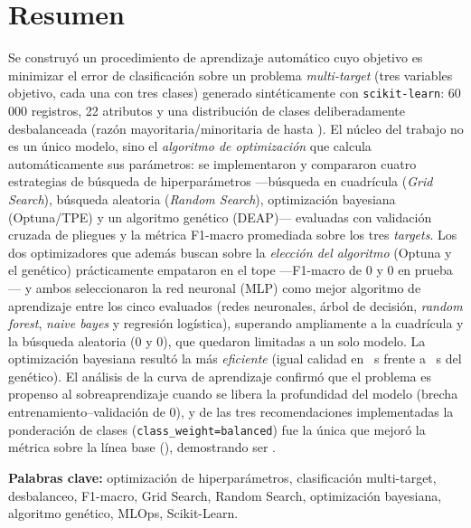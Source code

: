 \documentclass[11pt,a4paper,twocolumn]{article}
\providecommand{\Nsamples}{60\,000}\providecommand{\Nfeatures}{22}
\providecommand{\GridFtest}{0}\providecommand{\GridGap}{0}\providecommand{\GridHam}{0}\providecommand{\GridSubset}{0}
\providecommand{\RandFtest}{0}\providecommand{\RandGap}{0}\providecommand{\RandHam}{0}\providecommand{\RandSubset}{0}
\providecommand{\OptunaFtest}{0}\providecommand{\OptunaGap}{0}\providecommand{\OptunaHam}{0}\providecommand{\OptunaSubset}{0}
\providecommand{\GenFtest}{0}\providecommand{\GenGap}{0}\providecommand{\GenHam}{0}\providecommand{\GenSubset}{0}
\providecommand{\LCgap}{0}\providecommand{\LCtrainEnd}{0}\providecommand{\LCcvEnd}{0}\providecommand{\LCcvStart}{0}\providecommand{\PCAneff}{16}
\begin{document}
\section*{Resumen}
Se construyó un procedimiento de aprendizaje automático cuyo objetivo es minimizar el error de
clasificación sobre un problema \textit{multi-target} (tres variables objetivo, cada una con tres clases)
generado sintéticamente con \texttt{scikit-learn}: \Nsamples{} registros, \Nfeatures{} atributos y una
distribución de clases deliberadamente desbalanceada (razón mayoritaria/minoritaria de hasta \IRmax{}). El
núcleo del trabajo no es un único modelo, sino el \emph{algoritmo de optimización} que calcula
automáticamente sus parámetros: se implementaron y compararon cuatro estrategias de búsqueda de
hiperparámetros ---búsqueda en cuadrícula (\textit{Grid Search}), búsqueda aleatoria (\textit{Random
Search}), optimización bayesiana (Optuna/TPE) y un algoritmo genético (DEAP)--- evaluadas con validación
cruzada de \CVfolds{} pliegues y la métrica F1-macro promediada sobre los tres \textit{targets}. Los dos
optimizadores que además buscan sobre la \emph{elección del algoritmo} (Optuna y el genético) prácticamente
empataron en el tope ---F1-macro de \OptunaFtest{} y \GenFtest{} en prueba--- y ambos seleccionaron la red
neuronal (MLP) como mejor algoritmo de aprendizaje entre los cinco evaluados (redes neuronales, árbol de
decisión, \textit{random forest}, \textit{naive bayes} y regresión logística), superando ampliamente a la
cuadrícula y la búsqueda aleatoria (\GridFtest{} y \RandFtest{}), que quedaron limitadas a un solo modelo.
La optimización bayesiana resultó la más \emph{eficiente} (igual calidad en \OptunaTime{}~s frente a
\GenTime{}~s del genético). El análisis de la curva de
aprendizaje confirmó que el problema es propenso al sobreaprendizaje cuando se libera la profundidad del
modelo (brecha entrenamiento--validación de \LCgap{}), y de las tres recomendaciones implementadas la
ponderación de clases (\texttt{class\_weight=balanced}) fue la única que mejoró la métrica sobre la línea
base (\RecOneDelta{}), demostrando ser \RecOneViable{}.

\vspace{0.3em}
\noindent\textbf{Palabras clave:} optimización de hiperparámetros, clasificación multi-target,
desbalanceo, F1-macro, Grid Search, Random Search, optimización bayesiana, algoritmo genético, MLOps,
Scikit-Learn.

\end{document}
